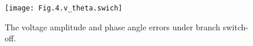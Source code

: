 \documentclass[lettersize,journal]{IEEEtran}
\begin{document}
\begin{figure}[!t]
\vspace{-0.2cm}  %
\setlength{\abovecaptionskip}{-0.1cm}   %
\setlength{\belowcaptionskip}{-2cm}   %
\centering
\texttt{[image: Fig.4.v\_theta.swich]}
\caption{The voltage amplitude and phase angle errors under branch switch-off.}
\label{fig5}
\vspace{-3ex}
\end{figure}

\begin{comment}
\begin{table}
\centering
\caption{Time-consuming}
\label{tab1}
\begin{tabular}{llllllllll}
\hline
Method  &  \begin{tabular} [c]{@{}l@{}}  M0 \end{tabular}  &  \begin{tabular} [c]{@{}l@{}} M1 \end{tabular}  &  \begin{tabular}  [c]{@{}l@{}} M2 \end{tabular}  &  \begin{tabular}[c]{@{}l@{}}M3 \end{tabular}  &  \begin{tabular}  [c]{@{}l@{}} M4 \end{tabular}  & \begin{tabular}[c]{@{}l@{}}M5 \end{tabular}  &\begin{tabular}[c]{@{}l@{}}M6 \end{tabular}  & \begin{tabular}  [c]{@{}l@{}} M7 \end{tabular}  \\
\hline
\begin{tabular}[c]{@{}l@{}}Times/(ms)\end{tabular}   & 137.2   & 9.3   & 10.1    &9.2   & 10.1   & 10.1    & 10.2   & 10.2  \\
\hline 
\end{tabular}
\end{table}
\end{comment}

\vspace{-0.8em}
\end{document}
